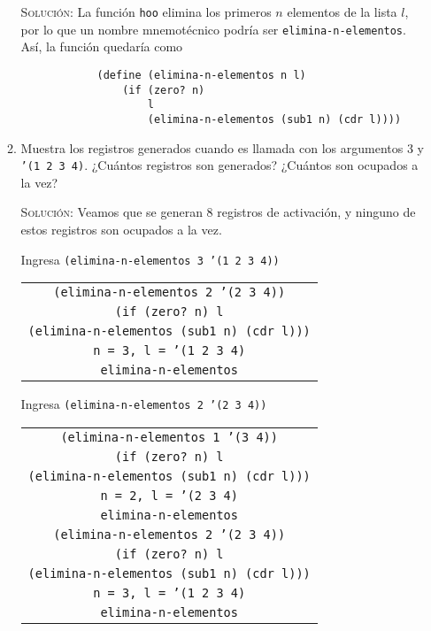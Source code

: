 \documentclass[letterpaper,11pt]{article}
\begin{document}
\begin{enumerate}
\begin{enumerate}
        \textsc{Solución:} La función \texttt{hoo} elimina los primeros $n$
        elementos de la lista $l$, por lo que un nombre mnemotécnico podría 
        ser \texttt{elimina-n-elementos}. Así, la función quedaría como
        \begin{verbatim}
            (define (elimina-n-elementos n l)
                (if (zero? n)
                    l
                    (elimina-n-elementos (sub1 n) (cdr l))))
        \end{verbatim}

        \item Muestra los registros generados cuando es llamada con los 
        argumentos $3$ y \texttt{'(1 2 3 4)}. ¿Cuántos registros son generados?
        ¿Cuántos son ocupados a la vez?

        \textsc{Solución:} Veamos que se generan $8$ registros de activación, 
        y ninguno de estos registros son ocupados a la vez.

        Ingresa \texttt{(elimina-n-elementos 3 '(1 2 3 4))}
        \begin{center}
            \begin{tabular}[h]{|c|}
                \hline
                \texttt{(elimina-n-elementos 2 '(2 3 4))} \\
                \texttt{(if (zero? n) l} \\
                \texttt{(elimina-n-elementos (sub1 n) (cdr l)))} \\
                \texttt{n = 3, l = '(1 2 3 4)} \\
                \texttt{elimina-n-elementos} \\
                \hline
            \end{tabular}
        \end{center}
        
        Ingresa \texttt{(elimina-n-elementos 2 '(2 3 4))}
        \begin{center}
            \begin{tabular}[h]{|c|}
                \hline
                \texttt{(elimina-n-elementos 1 '(3 4))} \\
                \texttt{(if (zero? n) l} \\
                \texttt{(elimina-n-elementos (sub1 n) (cdr l)))} \\
                \texttt{n = 2, l = '(2 3 4)} \\
                \texttt{elimina-n-elementos} \\
                \hline
                \hline
                \texttt{(elimina-n-elementos 2 '(2 3 4))} \\
                \texttt{(if (zero? n) l} \\
                \texttt{(elimina-n-elementos (sub1 n) (cdr l)))} \\
                \texttt{n = 3, l = '(1 2 3 4)} \\
                \texttt{elimina-n-elementos} \\
                \hline
            \end{tabular}
        \end{center}


\end{enumerate}
\end{enumerate}
\end{document}
